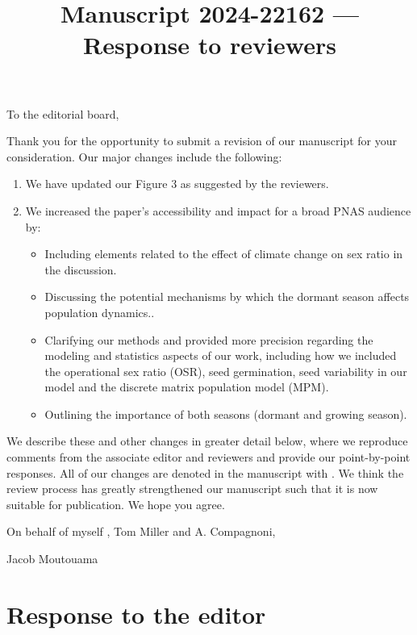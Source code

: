 \documentclass[12pt]{article}
\newcommand{\revise}[1]{{\color{Mahogany}{#1}}}
\begin{document}
\title{Manuscript 2024-22162 --- Response to reviewers}

\maketitle
\noindent To the editorial board,

Thank you for the opportunity to submit a revision of our manuscript for your consideration. Our major changes include the following:
\begin{enumerate}
	\item We have updated our Figure 3 as suggested by the reviewers.
	\item We increased the paper’s accessibility and impact for a broad PNAS audience by: 
	\begin{itemize}
	\item Including elements related to the effect of climate change on sex ratio in the discussion. 
	\item Discussing the potential mechanisms by which the dormant season affects population dynamics..
	\item Clarifying our methods and provided more precision regarding the modeling and statistics aspects of our work, including how we included the operational sex ratio (OSR), seed germination, seed variability in our model and the discrete matrix population model (MPM).
	\item Outlining the importance of both seasons  (dormant and growing season).
	\end{itemize}
\end{enumerate}

We describe these and other changes in greater detail below, where we reproduce comments from the associate editor and reviewers and provide our point-by-point responses. 
All of our changes are denoted in the manuscript with \revise{Mahogany font}.
We think the review process has greatly strengthened our manuscript such that it is now suitable for publication.
We hope you agree. 

\vspace{2em}
\hfill On behalf of myself , Tom Miller and A. Compagnoni,

\hfill  Jacob Moutouama
\newpage

\section{Response to  the editor}
\vspace{-2em}
\end{document}
